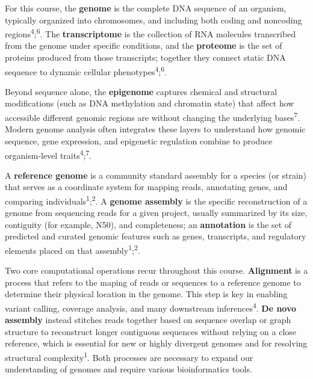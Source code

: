 \documentclass[
  letterpaper,
  DIV=11,
  numbers=noendperiod]{scrreprt}
\begin{document}
For this course, the \textbf{genome} is the complete DNA sequence of an
organism, typically organized into chromosomes, and including both
coding and noncoding regions\textsuperscript{4};\textsuperscript{6}. The
\textbf{transcriptome} is the collection of RNA molecules transcribed
from the genome under specific conditions, and the \textbf{proteome} is
the set of proteins produced from those transcripts; together they
connect static DNA sequence to dynamic cellular
phenotypes\textsuperscript{4};\textsuperscript{6}.

Beyond sequence alone, the \textbf{epigenome} captures chemical and
structural modifications (such as DNA methylation and chromatin state)
that affect how accessible different genomic regions are without
changing the underlying bases\textsuperscript{7}. Modern genome analysis
often integrates these layers to understand how genomic sequence, gene
expression, and epigenetic regulation combine to produce organism‑level
traits\textsuperscript{4};\textsuperscript{7}.

A \textbf{reference genome} is a community standard assembly for a
species (or strain) that serves as a coordinate system for mapping
reads, annotating genes, and comparing
individuals\textsuperscript{1};\textsuperscript{2}. A \textbf{genome
assembly} is the specific reconstruction of a genome from sequencing
reads for a given project, usually summarized by its size, contiguity
(for example, N50), and completeness; an \textbf{annotation} is the set
of predicted and curated genomic features such as genes, transcripts,
and regulatory elements placed on that
assembly\textsuperscript{1};\textsuperscript{2}.

Two core computational operations recur throughout this course.
\textbf{Alignment} is a process that refers to the maping of reads or
sequences to a reference genome to determine their physical location in
the genome. This step is key in enabling variant calling, coverage
analysis, and many downstream inferences\textsuperscript{4}. \textbf{De
novo assembly} instead stitches reads together based on sequence overlap
or graph structure to reconstruct longer contiguous sequences without
relying on a close reference, which is essential for new or highly
divergent genomes and for resolving structural
complexity\textsuperscript{1}. Both processes are necessary to expand
our understanding of genomes and require various bioinformatics tools.
\end{document}
